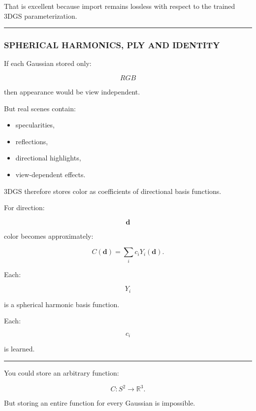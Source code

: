 That is excellent because import remains lossless with respect to the trained 3DGS parameterization.

\begin{center}\rule{0.5\linewidth}{0.5pt}\end{center}

\subsubsection{SPHERICAL HARMONICS, PLY AND IDENTITY}\label{04-visual-computing-ii-ch037-spherical-harmonics-ply-and-identity}

\hypertarget{04-visual-computing-ii-ch037-spherical-harmonics-ply-and-identity}{}

If each Gaussian stored only:

\[
RGB
\]

then appearance would be view independent.

But real scenes contain:

\begin{itemize}
\tightlist
\item
  specularities,
\item
  reflections,
\item
  directional highlights,
\item
  view-dependent effects.
\end{itemize}

3DGS therefore stores color as coefficients of directional basis functions.

For direction:

\[
\mathbf d
\]

color becomes approximately:

\[
\boxed{
C(\mathbf d)
=
\sum_i
c_iY_i(\mathbf d).
}
\]

Each:

\[
Y_i
\]

is a spherical harmonic basis function.

Each:

\[
c_i
\]

is learned.

\begin{center}\rule{0.5\linewidth}{0.5pt}\end{center}

You could store an arbitrary function:

\[
C:S^2\rightarrow\mathbb R^3.
\]

But storing an entire function for every Gaussian is impossible.

